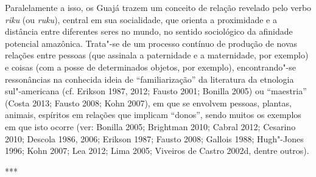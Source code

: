 Paralelamente a isso, os Guajá trazem um conceito de relação revelado
pelo verbo \emph{riku} (ou \emph{ruku}), central em sua socialidade, que
orienta a proximidade e a distância entre diferentes seres no mundo, no
sentido sociológico da afinidade potencial amazônica. Trata"-se de um
processo contínuo de produção de novas relações entre pessoas (que
assinala a paternidade e a maternidade, por exemplo) e coisas (com a
posse de determinados objetos, por exemplo), encontrando"-se ressonâncias
na conhecida ideia de ``familiarização'' da literatura da etnologia
sul"-americana (cf. Erikson 1987, 2012; Fausto 2001; Bonilla 2005) ou
``maestria'' (Costa 2013; Fausto 2008; Kohn 2007), em que se envolvem
pessoas, plantas, animais, espíritos em relações que implicam ``donos'',
sendo muitos os exemplos em que isto ocorre (ver: Bonilla 2005;
Brightman 2010; Cabral 2012; Cesarino 2010; Descola 1986, 2006; Erikson
1987; Fausto 2008; Gallois 1988; Hugh"-Jones 1996; Kohn 2007; Lea 2012;
Lima 2005; Viveiros de Castro 2002d, dentre outros).

\begin{center}
***
\end{center}

